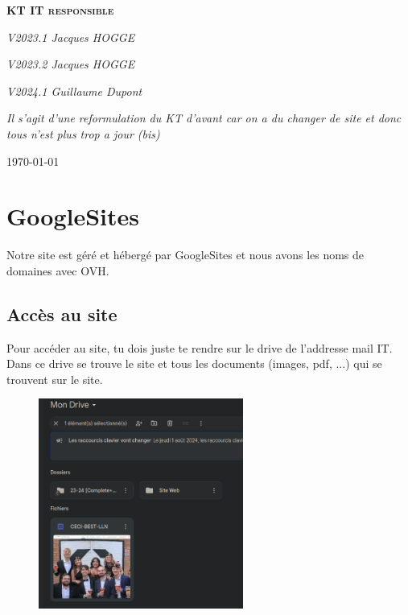 \documentclass[12pt]{article}
\begin{document}
\begin{titlepage}
	\centering
	
	
	\vspace{0.5cm}
	{\Large \scshape\bfseries KT IT responsible}
	\vspace{0.5cm}

	{ \Huge }
	

	{\itshape V2023.1 \large  Jacques HOGGE \par}
	{\itshape V2023.2 \large  Jacques HOGGE \par}
	{\itshape V2024.1 \large  Guillaume Dupont \par}

	\vspace{5cm}
	
	
	\textit{Il s'agit d'une reformulation du KT d'avant car on a du changer de site et donc tous n'est plus trop a jour (bis)}
	

	\vfill
	
    {\Large  \today}
\end{titlepage}
\newpage

\section{GoogleSites}\label{GoogleSites}
	Notre site est géré et hébergé par GoogleSites et nous avons les noms de domaines avec OVH.
	
	\subsection{Accès au site}
		Pour accéder au site, tu dois juste te rendre sur le drive de l'addresse mail IT. Dans ce drive se trouve le site et tous les documents (images, pdf, ...) qui se trouvent sur le site.
	 	\begin{figure}[htp]
			\centering
			\includegraphics[width=0.6\textwidth]{img/AccessSite.png}
		\end{figure} 
\end{document}
